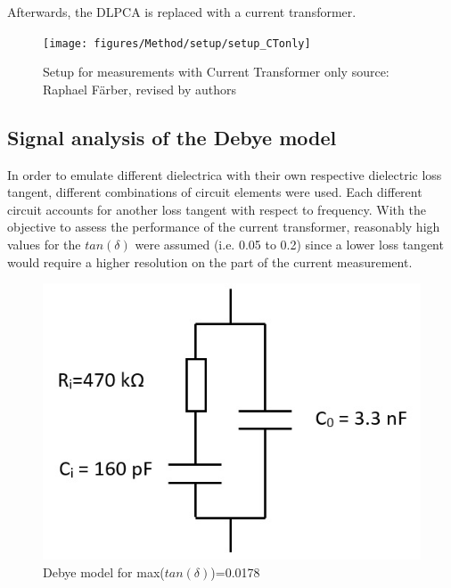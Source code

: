 Afterwards, the DLPCA is replaced with a current transformer. 
\begin{figure}[htbp]
	\centering

	\texttt{[image: figures/Method/setup/setup\_CTonly]}		

	\caption[Kurze Abbildungsbeschreibung]{Setup for measurements with Current Transformer only {source: Raphael F\"arber, revised by authors}} 
	\label{sec.setup }

\end{figure}


\subsection{Signal analysis of the Debye model}

In order to emulate different dielectrica with their own respective dielectric loss tangent, different combinations of circuit elements were used. Each different circuit accounts for another loss tangent with respect to frequency. With the objective to assess the performance of the current transformer, reasonably high values for the $tan\left(\delta\right)$ were assumed (i.e. 0.05 to 0.2) since a lower loss tangent would require a higher resolution on the part of the current measurement.
\begin{figure}
	\includegraphics[width=\textwidth]{figures/Method/debye-modell.jpg}	
	\caption{Debye model for max($tan(\delta)$)=0.0178}	
	\label{fig.debye-modell}
\end{figure}

